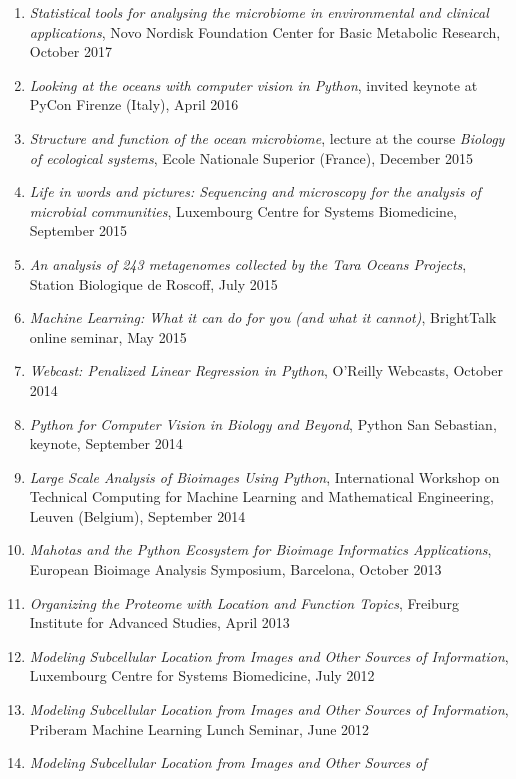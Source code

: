 \documentclass{article}
\begin{document}
\begin{enumerate}
{    microbial communities}, Dept.\ of Biomedical Research, University of Bern,
    November 2017
\item \emph{Statistical tools for analysing the microbiome in environmental and
    clinical applications}, Novo Nordisk Foundation Center for Basic Metabolic
    Research, October 2017
\item \emph{Looking at the oceans with computer vision in Python}, invited
    keynote at PyCon Firenze (Italy), April 2016
\item \emph{Structure and function of the ocean microbiome}, lecture at the
    course \textit{Biology of ecological systems}, Ecole Nationale Superior
    (France), December 2015
\item \emph{Life in words and pictures: Sequencing and microscopy for the analysis
    of microbial communities}, Luxembourg Centre for Systems Biomedicine,
    September 2015
\item \emph{An analysis of 243 metagenomes collected by the Tara Oceans
    Projects}, Station Biologique de Roscoff, July 2015
\item \emph{Machine Learning: What it can do for you (and what it cannot)},
    BrightTalk online seminar, May 2015
\item \emph{Webcast: Penalized Linear Regression in Python}, O'Reilly Webcasts,
    October 2014
\item \emph{Python for Computer Vision in Biology and Beyond}, Python San
    Sebastian, keynote, September 2014
\item \emph{Large Scale Analysis of Bioimages Using Python}, International
    Workshop on Technical Computing for Machine Learning and Mathematical
    Engineering, Leuven (Belgium), September 2014
\item \emph{Mahotas and the Python Ecosystem for Bioimage Informatics
Applications}, European Bioimage Analysis Symposium, Barcelona, October 2013
\item \emph{Organizing the Proteome with Location and Function Topics},
Freiburg Institute for Advanced Studies, April 2013
\item \emph{Modeling Subcellular Location from Images and Other Sources of
Information}, Luxembourg Centre for Systems Biomedicine, July 2012
\item \emph{Modeling Subcellular Location from Images and Other Sources of
Information}, Priberam Machine Learning Lunch Seminar, June 2012
\item \emph{Modeling Subcellular Location from Images and Other Sources of
}
\end{enumerate}
\end{document}
